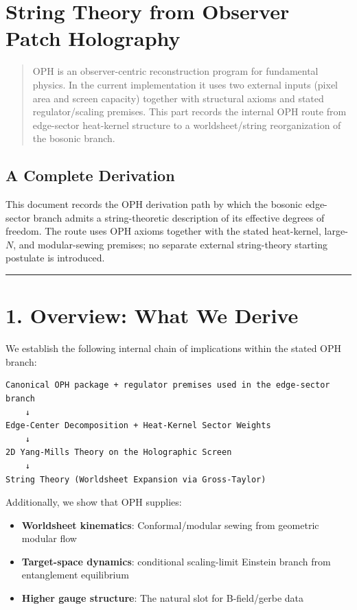 \section{String Theory from Observer Patch Holography}\label{string-theory-from-observer-patch-holography}

\begin{quote}
OPH is an observer-centric reconstruction program for fundamental physics. In the current implementation it uses two external inputs (pixel area and screen capacity) together with structural axioms and stated regulator/scaling premises. This part records the internal OPH route from edge-sector heat-kernel structure to a worldsheet/string reorganization of the bosonic branch.
\end{quote}

\subsection{A Complete Derivation}\label{a-complete-derivation}

This document records the OPH derivation path by which the bosonic edge-sector branch admits a string-theoretic description of its effective degrees of freedom. The route uses OPH axioms together with the stated heat-kernel, large-\(N\), and modular-sewing premises; no separate external string-theory starting postulate is introduced.

\begin{center}\rule{0.5\linewidth}{0.5pt}\end{center}

\section{1. Overview: What We Derive}\label{1-overview-what-we-derive}

We establish the following internal chain of implications within the stated OPH branch:

\begin{verbatim}
Canonical OPH package + regulator premises used in the edge-sector branch
    ↓
Edge-Center Decomposition + Heat-Kernel Sector Weights
    ↓
2D Yang-Mills Theory on the Holographic Screen
    ↓
String Theory (Worldsheet Expansion via Gross-Taylor)
\end{verbatim}

Additionally, we show that OPH supplies:

\begin{itemize}
\tightlist
\item
  \textbf{Worldsheet kinematics}: Conformal/modular sewing from geometric modular flow
\item
  \textbf{Target-space dynamics}: conditional scaling-limit Einstein branch from entanglement equilibrium
\item
  \textbf{Higher gauge structure}: The natural slot for B-field/gerbe data
\end{itemize}

